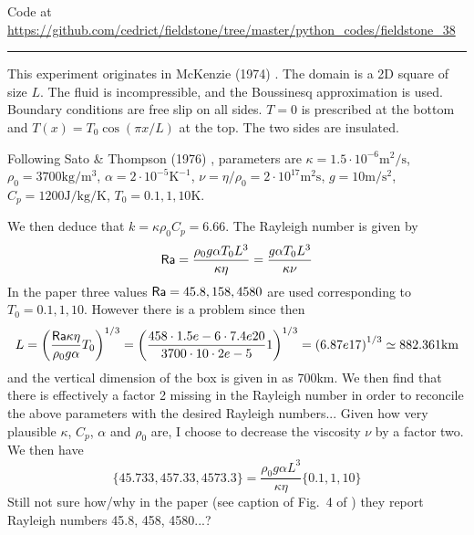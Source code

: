 

\begin{center}
Code at \url{https://github.com/cedrict/fieldstone/tree/master/python_codes/fieldstone_38}
\end{center}

\par\noindent\rule{\textwidth}{0.4pt}



This experiment originates in McKenzie \etal (1974) \cite{mcrw74}. The domain is a 2D 
square of size $L$. The fluid is incompressible, and the Boussinesq approximation is used.
Boundary conditions are free slip on all sides. $T=0$ is prescribed at the bottom 
and $T(x)=T_0 \cos (\pi x/L)$ at the top. The two sides are insulated.

Following Sato \& Thompson (1976) \cite{sath76}, 
parameters are $\kappa=1.5\cdot 10^{-6}\si{\square\m\per\second}$, 
$\rho_0=3700\si{\kg\per\cubic\metre}$, $\alpha=2\cdot 10^{-5}\si{\kelvin}^{-1}$, 
$\nu=\eta/\rho_0=2\cdot10^{17} \si{\square\metre\second}$, $g=10\si{\metre\per\square\second}$, 
$C_p=1200 \si{\joule\per\kg\per\kelvin}$, $T_0=0.1,1,10\si{\kelvin}$.  

We then deduce that $k=\kappa \rho_0 C_p = 6.66$. The Rayleigh number is given by
\[
{\mathsf{Ra}} 
= \frac{ \rho_0 g \alpha T_0 L^3  }{\kappa \eta}
= \frac{  g \alpha T_0 L^3  }{\kappa \nu}
\]
In the paper three values ${\mathsf{Ra}}=45.8,158,4580$ are used  corresponding to $T_0=0.1,1,10$. 
However there is a problem since then 
\[
L = \left( \frac{{\mathsf{Ra}} \kappa \eta}{\rho_0 g \alpha } T_0   \right)^{1/3}
= \left( \frac{458\cdot 1.5e-6\cdot 7.4e20}{3700\cdot 10\cdot 2e-5 } 1   \right)^{1/3}
= \left( 6.87e17 \right)^{1/3}
\simeq 882.361 \si{\kilo\metre}
\]
and the vertical dimension of the box is given in \cite{mcrw74} as 700\si{\km}. 
We then find that there is effectively a factor 2 missing in the Rayleigh number in order
to reconcile the above parameters with the desired Rayleigh numbers... 
Given how very plausible $\kappa$, $C_p$, $\alpha$ and $\rho_0$ are, I choose to 
decrease the viscosity $\nu$ by a factor two.
We then have 
\[
\{ 45.733, 457.33, 4573.3 \} = \frac{ \rho_0 g \alpha  L^3  }{\kappa \eta} \{ 0.1, 1, 10\}
\]
Still not sure how/why in the paper (see caption of Fig.~4 of \cite{mcrw74}) 
they report Rayleigh numbers 45.8, 458, 4580...?

